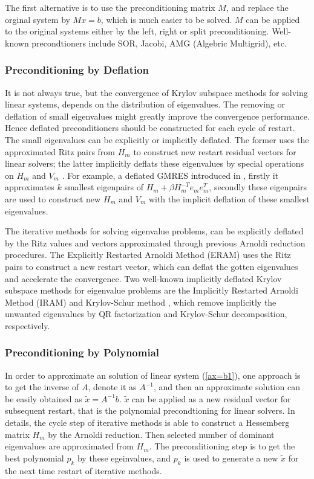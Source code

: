 The first alternative is to use the preconditioning matrix $M$, and replace the orginal system by $Mx=b$, which is much easier to be solved. $M$ can be applied to the original systems either by the left, right or split preconditioning. Well-known precondtioners include SOR, Jacobi, AMG (Algebric Multigrid), etc.

\subsubsection{Preconditioning by Deflation}

It is not always true, but the convergence of Krylov subspace methods for solving linear systems, depends on the distribution of eigenvalues. The removing or deflation of small eigenvalues might greatly improve the convergence performance. Hence deflated preconditioners should be constructed for each cycle of restart. The small eigenvalues can be explicitly or implicitly deflated. The former uses the approximated Ritz pairs from $H_m$ to construct new restart residual vectors for linear solvers; the latter implicitly deflats these eigenvalues by special operations on $H_m$ and $V_m$ \cite{erhel1996restarted,burrage1998deflation,morgan2002gmres}. For example, a deflated GMRES introduced in \cite{morgan2002gmres}, firstly it approximates $k$ smallest eigenpairs of $H_m+\beta H_m^{-T}e_me_m^T$, secondly these eigenpairs are used to construct new $H_m$ and $V_m$ with the implicit deflation of these smallest eigenvalues.

The iterative methods for solving eigenvalue problems, can be explicitly deflated by the Ritz values and vectors approximated through previous Arnoldi reduction procedures. The Explicitly Restarted Arnoldi Method (ERAM) uses the Ritz pairs to construct a new restart vector, which can deflat the gotten eigenvalues and accelerate the convergence. Two well-known implicitly  deflated Krylov subspace methods for eigenvalue problems are the Implicitly Restarted Arnoldi Method (IRAM) \cite{sorensen1997implicitly} and Krylov-Schur method \cite{stewart2002krylov}, which remove implicitly the unwanted eigenvalues by QR factorization and Krylov-Schur decomposition, respectively.

\subsubsection{Preconditioning by Polynomial}

In order to approximate an solution of linear system (\ref{ax=b1}), one approach is to get the inverse of $A$, denote it as $A^{-1}$, and then an approximate solution can be easily obtained as $\tilde{x}=A^{-1}b$. $\tilde{x}$ can be applied as a new  residual vector for subsequent restart, that is the polynomial precondtioning for linear solvers. In details, the cycle step of iterative methods is able to construct a Hessemberg matrix $H_m$ by the Arnoldi reduction. Then selected number of dominant eigenvalues are approximated from $H_m$. The preconditioning step is to get the best polynomial $p_k$ by these egeinvalues, and $p_k$ is used to generate a new  $\tilde{x}$ for the next time restart of iterative methods.

